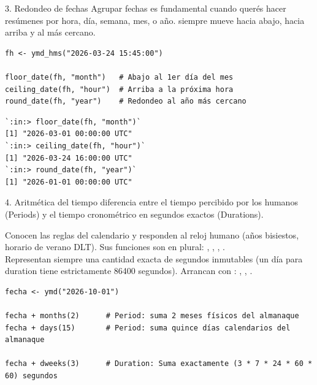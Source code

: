\documentclass[8pt]{beamer}
\begin{document}
	\begin{frame}[fragile]{3. Redondeo de fechas}
		Agrupar fechas es fundamental cuando querés hacer resúmenes por hora, día, semana, mes, o año.  siempre mueve hacia abajo,  hacia arriba y  al más cercano.
		
\begin{lstlisting}[style=RScript]
fh <- ymd_hms("2026-03-24 15:45:00")

floor_date(fh, "month")   # Abajo al 1er día del mes
ceiling_date(fh, "hour")  # Arriba a la próxima hora
round_date(fh, "year")    # Redondeo al año más cercano
\end{lstlisting}
\begin{lstlisting}[style=RConsole]
`:in:> floor_date(fh, "month")`
[1] "2026-03-01 00:00:00 UTC"
`:in:> ceiling_date(fh, "hour")`
[1] "2026-03-24 16:00:00 UTC"
`:in:> round_date(fh, "year")`
[1] "2026-01-01 00:00:00 UTC"
\end{lstlisting}
	\end{frame}
	
	\begin{frame}[fragile]{4. Aritmética del tiempo}
		 diferencia entre el tiempo percibido por los humanos (Periods) y el tiempo cronométrico en segundos exactos (Durations).
		
			 Conocen las reglas del calendario y responden al reloj humano (años bisiestos, horario de verano DLT). Sus funciones son en plural: , , , .\\
			
			 Representan siempre una cantidad exacta de segundos inmutables (un día para duration tiene estrictamente 86400 segundos). Arrancan con : , , .

\begin{lstlisting}[style=RScript]
fecha <- ymd("2026-10-01")

fecha + months(2)      # Period: suma 2 meses físicos del almanaque
fecha + days(15)       # Period: suma quince días calendarios del almanaque

fecha + dweeks(3)      # Duration: Suma exactamente (3 * 7 * 24 * 60 * 60) segundos
\end{lstlisting}
	\end{frame}
\end{document}
